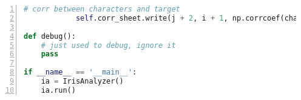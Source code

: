 \documentclass[12pt,a4paper]{article}
\theoremstyle{definition}
\begin{document}
\begin{appendix}
\begin{lstlisting}[language=Python,
		numbers=left,
		keywordstyle=\color{blue!70},
		commentstyle=\color{green!99!blue!99},
		frame=shadowbox,
		breaklines=True,
		title=Iris数据集探索代码]
            # corr between characters and target
            self.corr_sheet.write(j + 2, i + 1, np.corrcoef(char_data, self.target)[0][1])

def debug():
    # just used to debug, ignore it
    pass

if __name__ == '__main__':
    ia = IrisAnalyzer()
    ia.run()
		\end{lstlisting}
	
\end{appendix}

\end{document}
